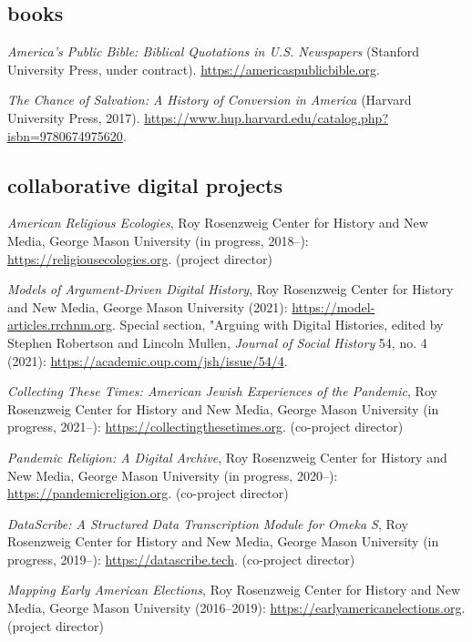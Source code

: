 \documentclass[11pt]{article}
\begin{document}

\subsection{books}\label{books}

\emph{America's Public Bible: Biblical Quotations in U.S. Newspapers} (Stanford University Press, under contract). \url{https://americaspublicbible.org}.

\emph{The Chance of Salvation: A History of Conversion in America} (Harvard University Press, 2017). \url{https://www.hup.harvard.edu/catalog.php?isbn=9780674975620}.

\subsection{collaborative digital projects}\label{digital projects}

\emph{American Religious Ecologies}, Roy Rosenzweig Center for History and New Media, George Mason University (in progress, 2018--): \url{https://religiousecologies.org}. (project director)

\emph{Models of Argument-Driven Digital History}, Roy Rosenzweig Center for History and New Media, George Mason University (2021): \url{https://model-articles.rrchnm.org}. Special section, "Arguing with Digital Histories, edited by Stephen Robertson and Lincoln Mullen, \emph{Journal of Social History} 54, no. 4 (2021): \url{https://academic.oup.com/jsh/issue/54/4}. 

\emph{Collecting These Times: American Jewish Experiences of the Pandemic}, Roy Rosenzweig Center for History and New Media, George Mason University (in progress, 2021--): \url{https://collectingthesetimes.org}. (co-project director)

\emph{Pandemic Religion: A Digital Archive}, Roy Rosenzweig Center for History and New Media, George Mason University (in progress, 2020--): \url{https://pandemicreligion.org}. (co-project director)

\emph{DataScribe: A Structured Data Transcription Module for Omeka S}, Roy Rosenzweig Center for History and New Media, George Mason University (in progress, 2019--): \url{https://datascribe.tech}. (co-project director)

\emph{Mapping Early American Elections}, Roy Rosenzweig Center for History and New Media, George Mason University (2016--2019): \url{https://earlyamericanelections.org}. (project director)
\end{document}
